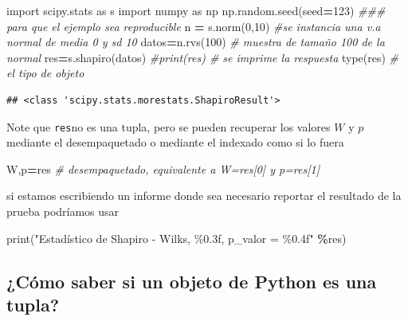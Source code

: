 \documentclass[
]{book}
\newenvironment{Shaded}{\begin{snugshade}}{\end{snugshade}}
\newcommand{\BuiltInTok}[1]{#1}
\newcommand{\CommentTok}[1]{\textcolor[rgb]{0.56,0.35,0.01}{\textit{#1}}}
\newcommand{\DecValTok}[1]{\textcolor[rgb]{0.00,0.00,0.81}{#1}}
\newcommand{\ImportTok}[1]{#1}
\newcommand{\NormalTok}[1]{#1}
\newcommand{\OperatorTok}[1]{\textcolor[rgb]{0.81,0.36,0.00}{\textbf{#1}}}
\newcommand{\SpecialCharTok}[1]{\textcolor[rgb]{0.00,0.00,0.00}{#1}}
\newcommand{\StringTok}[1]{\textcolor[rgb]{0.31,0.60,0.02}{#1}}
\theoremstyle{definition}
\theoremstyle{definition}
\theoremstyle{definition}
\theoremstyle{definition}
\theoremstyle{remark}
\begin{document}
\begin{Shaded}
\begin{Highlighting}[]
\ImportTok{import}\NormalTok{ scipy.stats }\ImportTok{as}\NormalTok{ s  }
\ImportTok{import}\NormalTok{ numpy }\ImportTok{as}\NormalTok{ np}
\NormalTok{np.random.seed(seed}\OperatorTok{=}\DecValTok{123}\NormalTok{) }\CommentTok{\#\#\# para que el ejemplo sea reproducible }
\NormalTok{n }\OperatorTok{=}\NormalTok{ s.norm(}\DecValTok{0}\NormalTok{,}\DecValTok{10}\NormalTok{) }\CommentTok{\#se instancia una v.a normal de media 0 y sd 10}
\NormalTok{datos}\OperatorTok{=}\NormalTok{n.rvs(}\DecValTok{100}\NormalTok{) }\CommentTok{\# muestra de tamaño 100 de la normal }
\NormalTok{res}\OperatorTok{=}\NormalTok{s.shapiro(datos)  }
\CommentTok{\#print(res) \# se imprime la respuesta  }
\BuiltInTok{type}\NormalTok{(res) }\CommentTok{\# el tipo de objeto }
\end{Highlighting}
\end{Shaded}

\begin{verbatim}
## <class 'scipy.stats.morestats.ShapiroResult'>
\end{verbatim}

Note que \texttt{res}no es una tupla, pero se pueden recuperar los valores \(W\) y \(p\) mediante el desempaquetado o mediante el indexado como si lo fuera

\begin{Shaded}
\begin{Highlighting}[]
\NormalTok{W,p}\OperatorTok{=}\NormalTok{res  }\CommentTok{\# desempaquetado, equivalente a W=res[0] y p=res[1]}
\end{Highlighting}
\end{Shaded}

si estamos escribiendo un informe donde sea necesario reportar el resultado de la prueba podríamos usar

\begin{Shaded}
\begin{Highlighting}[]
\BuiltInTok{print}\NormalTok{(}\StringTok{"Estadístico de Shapiro {-} Wilks, }\SpecialCharTok{\%0.3f}\StringTok{, p\_valor = }\SpecialCharTok{\%0.4f}\StringTok{"} \OperatorTok{\%}\NormalTok{res)}
\end{Highlighting}
\end{Shaded}

\hypertarget{cuxf3mo-saber-si-un-objeto-de-python-es-una-tupla}{%
\subsection{¿Cómo saber si un objeto de Python es una tupla?}\label{cuxf3mo-saber-si-un-objeto-de-python-es-una-tupla}}
\end{document}
